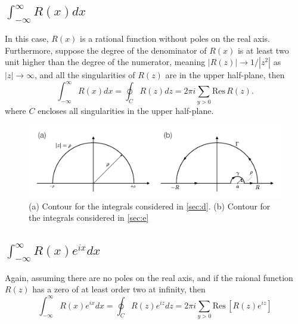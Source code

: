 \documentclass[11pt, letterpaper]{article}
\begin{document}
\subsection{$\displaystyle\int_{-\infty}^{\infty}R(x)dx$}
\label{sec:b}
In this case, $R(x)$ is a rational function without poles on the real axis. Furthermore, suppose the degree of the
denominator of $R(x)$ is at least two unit higher than the degree of the numerator, meaning $|R(z)|\rightarrow 1/|z^2|$
as $|z|\rightarrow\infty$, and all the singularities of $R(z)$ are in the upper half-plane, then 
\begin{equation}
	\int_{-\infty}^\infty R(x)dx = \oint_C R(z)dz = 2\pi i\sum_{y > 0} \mbox{Res}\,R(z).
\end{equation}
where $C$ encloses all singularities in the upper half-plane.

\begin{figure}
\includegraphics[width=\textwidth]{./figures/fig_complex_analysis.pdf}
\caption{(a) Contour for the integrals considered in \ref{sec:d}. (b) Contour for the integrals considered in \ref{sec:e}}
\label{fig:contour}
\end{figure}

\subsection{$\displaystyle\int_{-\infty}^{\infty}R(x)e^{ix}dx$}
\label{sec:c}
Again, assuming there are no poles on the real axis, and if the raional function $R(z)$ has a zero of at least order two
at infinity, then
\begin{equation}
	\int_{-\infty}^{\infty}R(x)e^{ix}dx = \oint_C R(z)e^{iz}dz = 2\pi i\sum_{y>0}\mbox{Res}\,\left[R(z)e^{iz}\right]
\end{equation}
\end{document}
